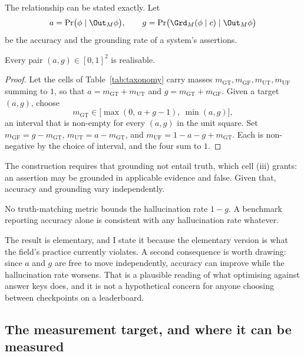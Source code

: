 The relationship can be stated exactly. Let
\[
  a = \Pr\bigl(\phi \mid \Out_M \phi\bigr), \qquad
  g = \Pr\bigl(\Grd_M(\phi \mid c) \mid \Out_M \phi\bigr)
\]
be the accuracy and the grounding rate of a system's assertions.

\begin{proposition}
\label{prop:independence}
Every pair $(a, g) \in [0,1]^2$ is realisable.
\end{proposition}

\begin{proof}
Let the cells of Table~\ref{tab:taxonomy} carry masses
$m_{\mathrm{GT}}, m_{\mathrm{GF}}, m_{\mathrm{UT}}, m_{\mathrm{UF}}$ summing to
$1$, so that $a = m_{\mathrm{GT}} + m_{\mathrm{UT}}$ and
$g = m_{\mathrm{GT}} + m_{\mathrm{GF}}$. Given a target $(a,g)$, choose
\[
  m_{\mathrm{GT}} \in \bigl[\max(0,\, a + g - 1),\ \min(a, g)\bigr],
\]
an interval that is non-empty for every $(a,g)$ in the unit square. Set
$m_{\mathrm{GF}} = g - m_{\mathrm{GT}}$,
$m_{\mathrm{UT}} = a - m_{\mathrm{GT}}$, and
$m_{\mathrm{UF}} = 1 - a - g + m_{\mathrm{GT}}$. Each is non-negative by the
choice of interval, and the four sum to $1$.
\end{proof}

The construction requires that grounding not entail truth, which cell (iii)
grants: an assertion may be grounded in applicable evidence and false. Given
that, accuracy and grounding vary independently.

\begin{corollary}
\label{cor:no-bound}
No truth-matching metric bounds the hallucination rate $1 - g$. A benchmark
reporting accuracy alone is consistent with any hallucination rate whatever.
\end{corollary}

The result is elementary, and I state it because the elementary version is what
the field's practice currently violates. A second consequence is worth drawing:
since $a$ and $g$ are free to move independently, accuracy can improve while the
hallucination rate worsens. That is a plausible reading of what optimising
against answer keys does, and it is not a hypothetical concern for anyone
choosing between checkpoints on a leaderboard.

\subsection{The measurement target, and where it can be measured}
\label{sec:measurement}

